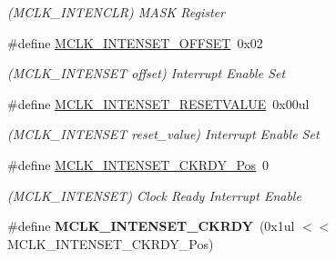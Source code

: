 \begin{DoxyCompactItemize}
\begin{DoxyCompactList}\small\item\em (M\+C\+L\+K\+\_\+\+I\+N\+T\+E\+N\+C\+L\+R) M\+A\+S\+K Register \end{DoxyCompactList}\item 
\hypertarget{group___s_a_m_l21___m_c_l_k_gab0258927c23f68d0f403a91f68fdc1a8}{}\#define \hyperlink{group___s_a_m_l21___m_c_l_k_gab0258927c23f68d0f403a91f68fdc1a8}{M\+C\+L\+K\+\_\+\+I\+N\+T\+E\+N\+S\+E\+T\+\_\+\+O\+F\+F\+S\+E\+T}~0x02\label{group___s_a_m_l21___m_c_l_k_gab0258927c23f68d0f403a91f68fdc1a8}

\begin{DoxyCompactList}\small\item\em (M\+C\+L\+K\+\_\+\+I\+N\+T\+E\+N\+S\+E\+T offset) Interrupt Enable Set \end{DoxyCompactList}\item 
\hypertarget{group___s_a_m_l21___m_c_l_k_ga1a1d204e6b63e6fb14793fad6be480b3}{}\#define \hyperlink{group___s_a_m_l21___m_c_l_k_ga1a1d204e6b63e6fb14793fad6be480b3}{M\+C\+L\+K\+\_\+\+I\+N\+T\+E\+N\+S\+E\+T\+\_\+\+R\+E\+S\+E\+T\+V\+A\+L\+U\+E}~0x00ul\label{group___s_a_m_l21___m_c_l_k_ga1a1d204e6b63e6fb14793fad6be480b3}

\begin{DoxyCompactList}\small\item\em (M\+C\+L\+K\+\_\+\+I\+N\+T\+E\+N\+S\+E\+T reset\+\_\+value) Interrupt Enable Set \end{DoxyCompactList}\item 
\hypertarget{group___s_a_m_l21___m_c_l_k_gab9fefb6acd254d502c9ea81d010831ff}{}\#define \hyperlink{group___s_a_m_l21___m_c_l_k_gab9fefb6acd254d502c9ea81d010831ff}{M\+C\+L\+K\+\_\+\+I\+N\+T\+E\+N\+S\+E\+T\+\_\+\+C\+K\+R\+D\+Y\+\_\+\+Pos}~0\label{group___s_a_m_l21___m_c_l_k_gab9fefb6acd254d502c9ea81d010831ff}

\begin{DoxyCompactList}\small\item\em (M\+C\+L\+K\+\_\+\+I\+N\+T\+E\+N\+S\+E\+T) Clock Ready Interrupt Enable \end{DoxyCompactList}\item 
\hypertarget{group___s_a_m_l21___m_c_l_k_ga23e45552d797bdc0fea7ff5e8e7ffab0}{}\#define {\bfseries M\+C\+L\+K\+\_\+\+I\+N\+T\+E\+N\+S\+E\+T\+\_\+\+C\+K\+R\+D\+Y}~(0x1ul $<$$<$ M\+C\+L\+K\+\_\+\+I\+N\+T\+E\+N\+S\+E\+T\+\_\+\+C\+K\+R\+D\+Y\+\_\+\+Pos)\label{group___s_a_m_l21___m_c_l_k_ga23e45552d797bdc0fea7ff5e8e7ffab0}


\end{DoxyCompactItemize}

